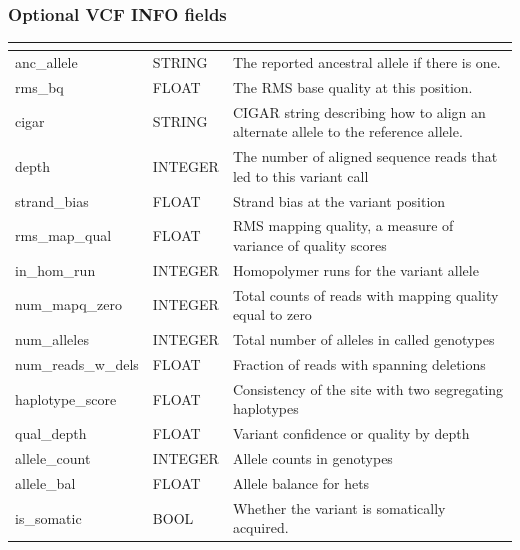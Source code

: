 \documentclass[letterpaper,10pt,english]{sphinxmanual}
\begin{document}
\subsubsection{Optional VCF INFO fields}
\label{content/database_schema:optional-vcf-info-fields}
\begin{tabulary}{\linewidth}{|L|L|L|}
\hline
\textbf{} & \textbf{} & \textbf{}\\\hline

anc\_allele
 & 
STRING
 & 
The reported ancestral allele if there is one.
\\\hline

rms\_bq
 & 
FLOAT
 & 
The RMS base quality at this position.
\\\hline

cigar
 & 
STRING
 & 
CIGAR string describing how to align an alternate allele to the reference allele.
\\\hline

depth
 & 
INTEGER
 & 
The number of aligned sequence reads that led to this variant call
\\\hline

strand\_bias
 & 
FLOAT
 & 
Strand bias at the variant position
\\\hline

rms\_map\_qual
 & 
FLOAT
 & 
RMS mapping quality, a measure of variance of quality scores
\\\hline

in\_hom\_run
 & 
INTEGER
 & 
Homopolymer runs for the variant allele
\\\hline

num\_mapq\_zero
 & 
INTEGER
 & 
Total counts of reads with mapping quality equal to zero
\\\hline

num\_alleles
 & 
INTEGER
 & 
Total number of alleles in called genotypes
\\\hline

num\_reads\_w\_dels
 & 
FLOAT
 & 
Fraction of reads with spanning deletions
\\\hline

haplotype\_score
 & 
FLOAT
 & 
Consistency of the site with two segregating haplotypes
\\\hline

qual\_depth
 & 
FLOAT
 & 
Variant confidence or quality by depth
\\\hline

allele\_count
 & 
INTEGER
 & 
Allele counts in genotypes
\\\hline

allele\_bal
 & 
FLOAT
 & 
Allele balance for hets
\\\hline

is\_somatic
 & 
BOOL
 & 
Whether the variant is somatically acquired.
\\\hline
\end{tabulary}
\end{document}
